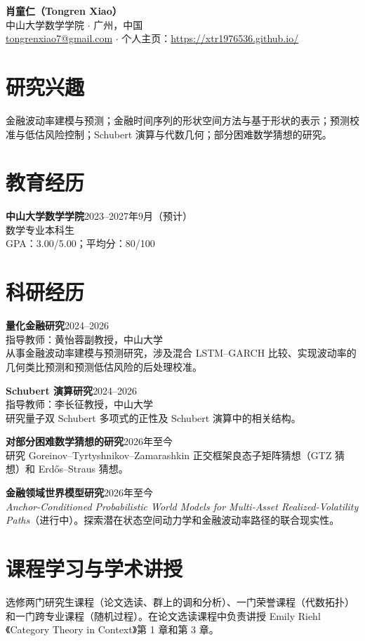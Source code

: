 \documentclass[a4paper]{ctexart}
\newcommand{\entry}[2]{\textbf{#1}\hfill #2\\}
\begin{document}
\begin{center}
{\Large\bfseries 肖童仁（Tongren Xiao）}\\[1pt]
中山大学数学学院 \quad $\cdot$ \quad 广州，中国\\
\href{mailto:tongrenxiao7@gmail.com}{tongrenxiao7@gmail.com} \quad $\cdot$ \quad
个人主页：\href{https://xtr1976536.github.io/}{https://xtr1976536.github.io/}
\end{center}

\section*{研究兴趣}
金融波动率建模与预测；金融时间序列的形状空间方法与基于形状的表示；预测校准与低估风险控制；Schubert 演算与代数几何；部分困难数学猜想的研究。

\section*{教育经历}
\entry{中山大学数学学院}{2023--2027年9月（预计）}
数学专业本科生\\
GPA：3.00/5.00；平均分：80/100

\section*{科研经历}
\entry{量化金融研究}{2024--2026}
指导教师：黄怡蓉副教授，中山大学\\
从事金融波动率建模与预测研究，涉及混合 LSTM--GARCH 比较、实现波动率的几何类比预测和预测低估风险的后处理校准。

\entry{Schubert 演算研究}{2024--2026}
指导教师：李长征教授，中山大学\\
研究量子双 Schubert 多项式的正性及 Schubert 演算中的相关结构。

\entry{对部分困难数学猜想的研究}{2026年至今}
研究 Goreinov--Tyrtyshnikov--Zamarashkin 正交框架良态子矩阵猜想（GTZ 猜想）和 Erdős--Straus 猜想。

\entry{金融领域世界模型研究}{2026年至今}
\textit{Anchor-Conditioned Probabilistic World Models for Multi-Asset Realized-Volatility Paths}（进行中）。探索潜在状态空间动力学和金融波动率路径的联合现实性。

\section*{课程学习与学术讲授}
选修两门研究生课程（论文选读、群上的调和分析）、一门荣誉课程（代数拓扑）和一门跨专业课程（随机过程）。在论文选读课程中负责讲授 Emily Riehl《Category Theory in Context》第 1 章和第 3 章。
\end{document}
